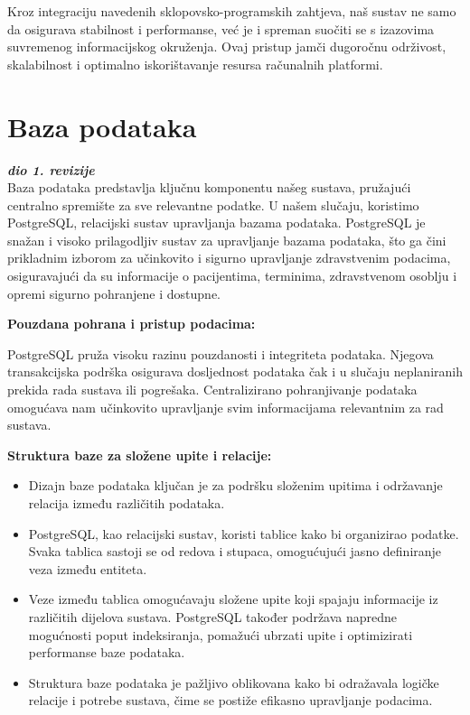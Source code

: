 Kroz integraciju navedenih sklopovsko-programskih zahtjeva, naš sustav ne samo da osigurava stabilnost i performanse, već je i spreman suočiti se s izazovima suvremenog informacijskog okruženja. Ovaj pristup jamči dugoročnu održivost, skalabilnost i optimalno iskorištavanje resursa računalnih platformi.

 


        \section{Baza podataka}
			
			\textbf{\textit{dio 1. revizije}}\\
			
Baza podataka predstavlja ključnu komponentu našeg sustava, pružajući centralno spremište za sve relevantne podatke. U našem slučaju, koristimo PostgreSQL, relacijski sustav upravljanja bazama podataka. PostgreSQL je snažan i visoko prilagodljiv sustav za upravljanje bazama podataka, što ga čini prikladnim izborom za učinkovito i sigurno upravljanje zdravstvenim podacima, osiguravajući da su informacije o pacijentima, terminima, zdravstvenom osoblju i opremi sigurno pohranjene i dostupne. 



\textbf{Pouzdana pohrana i pristup podacima:}

PostgreSQL pruža visoku razinu pouzdanosti i integriteta podataka. Njegova transakcijska podrška osigurava dosljednost podataka čak i u slučaju neplaniranih prekida rada sustava ili pogrešaka.
Centralizirano pohranjivanje podataka omogućava nam učinkovito upravljanje svim informacijama relevantnim za rad sustava.

\textbf{Struktura baze za složene upite i relacije:}
\begin{itemize}
\item Dizajn baze podataka ključan je za podršku složenim upitima i održavanje relacija između različitih podataka.
\item PostgreSQL, kao relacijski sustav, koristi tablice kako bi organizirao podatke. Svaka tablica sastoji se od redova i stupaca, omogućujući jasno definiranje veza između entiteta.
\item Veze između tablica omogućavaju složene upite koji spajaju informacije iz različitih dijelova sustava. 
PostgreSQL također podržava napredne mogućnosti poput indeksiranja, pomažući ubrzati upite i optimizirati performanse baze podataka.
\item  Struktura baze podataka je pažljivo oblikovana kako bi odražavala logičke relacije i potrebe sustava, čime se postiže efikasno upravljanje podacima.
\end{itemize}

